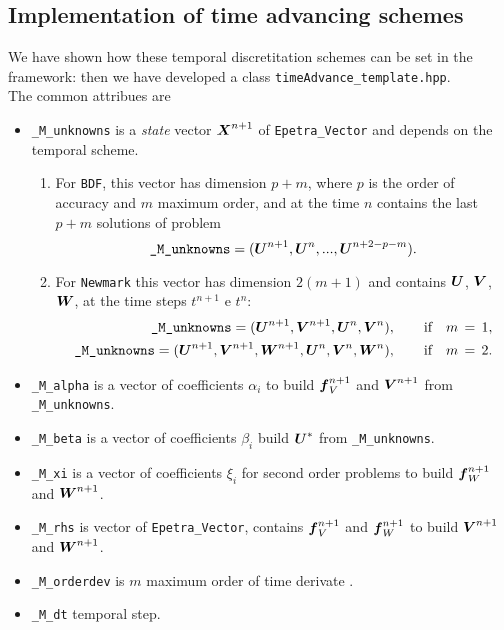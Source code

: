 \documentclass[english,a4paper]{article}
\newcommand{\Xbf}{\text{\mbox{\boldmath $X$}}}
\newcommand{\Ubf}{\text{\mbox{\boldmath $U$}}}
\newcommand{\Abf}{\text{\mbox{\boldmath $W$}}}
\newcommand{\fbf}{\text{\mbox{\boldmath $f$}}}
\newcommand{\Wbf}{\text{\mbox{\boldmath $V$}}}
\begin{document}
\subsection{Implementation of time advancing schemes}
We have shown how these temporal discretitation schemes  can be set in
the framework: then we have developed a class
\verb"timeAdvance_template.hpp".\\
The common attribues are
\begin{itemize}
  \item \verb"_M_unknowns"  is a {\sl state} vector $\Xbf^{n+1}$ of \verb"Epetra_Vector" and
    depends on the temporal scheme.
    \begin{enumerate}
    \item[]For \verb"BDF", this vector has dimension
      $p+m$, where $p$ is the order of accuracy and $m$ maximum order,
      and at the time $n$ contains  the last  $p+m$ solutions of problem
      \begin{displaymath}
        \verb"_M_unknowns"=(\Ubf^{n+1}, \Ubf^n,..., \Ubf^{n+2-p-m}).
      \end{displaymath}
    \item[] For \verb"Newmark" this vector has dimension $2(m+1)$ and contains $\Ubf$, $\Wbf$, $\Abf$, at the time  steps $t^{n+1}$ e $t^n$:
      \begin{eqnarray*}
        \verb"_M_unknowns"=(\Ubf^{n+1},\Wbf^{n+1}, \Ubf^n,
        \Wbf^n), \qquad \text{if}\quad m\,=\,1,
        \\
        \verb"_M_unknowns"=(\Ubf^{n+1},\Wbf^{n+1}, \Abf^{n+1}, \Ubf^n,
        \Wbf^n, \Abf^n),\qquad \text{if}\quad m\,=\,2.
      \end{eqnarray*}
    \end{enumerate}
   \item \verb"_M_alpha" is a vector of coefficients $\alpha_i$ to
    build $\fbf_V^{n+1}$ and $\Wbf^{n+1}$ from \verb"_M_unknowns".
  \item \verb"_M_beta" is a vector of coefficients $\beta_i$  build
    $\Ubf^*$  from \verb"_M_unknowns".
  \item \verb"_M_xi" is a vector of coefficients $\xi_i$ for second
    order problems to  build $\fbf_W^{n+1}$ and $\Abf^{n+1}$.
  \item \verb"_M_rhs" is vector of \verb"Epetra_Vector", contains
    $\fbf_V^{n+1}$ and $\fbf_W^{n+1}$ to build $\Wbf^{n+1}$ and $\Abf^{n+1}$.
  \item \verb"_M_orderdev" is  $m$ maximum order of time derivate .
  \item \verb"_M_dt" temporal step.
  \end{itemize}
\end{document}
